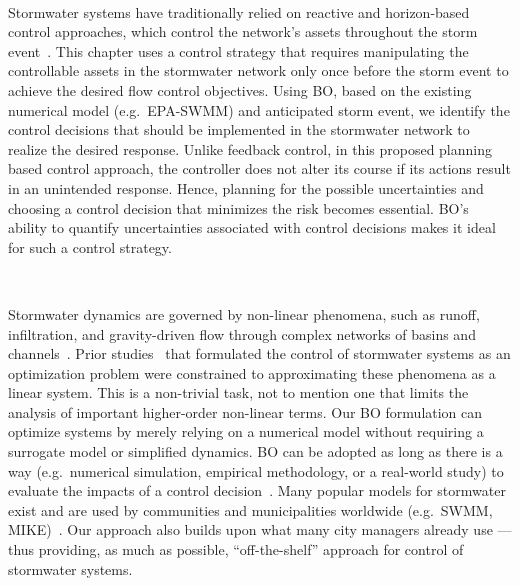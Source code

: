 \

Stormwater systems have traditionally relied on reactive and horizon-based control approaches, which control the network's assets throughout the storm event~\cite{sadler2019, vezzaro2014, Troutman_2020}.
This chapter uses a control strategy that requires manipulating the controllable assets in the stormwater network only once before the storm event to achieve the desired flow control objectives.
Using BO, based on the existing numerical model (e.g.\ EPA-SWMM) and anticipated storm event, we identify the control decisions that should be implemented in the stormwater network to realize the desired response.
Unlike feedback control, in this proposed planning based control approach, the controller does not alter its course if its actions result in an unintended response. 
Hence, planning for the possible uncertainties and choosing a control decision that minimizes the risk becomes essential.
BO's ability to quantify uncertainties associated with control decisions makes it ideal for such a control strategy.


\

Stormwater dynamics are governed by non-linear phenomena, such as runoff, infiltration, and gravity-driven flow through complex networks of basins and channels~\cite{rossman2010storm, Mullapudi_Wong_Kerkez_2017, Rimer2019}.
Prior studies~\cite{lund2020cso} that formulated the control of stormwater systems as an optimization problem were constrained to approximating these phenomena as a linear system.
This is a non-trivial task, not to mention one that limits the analysis of important higher-order non-linear terms. 
Our BO formulation can optimize systems by merely relying on a numerical model without requiring a surrogate model or simplified dynamics.
BO can be adopted as long as there is a way (e.g.\ numerical simulation, empirical methodology, or a real-world study) to evaluate the impacts of a control decision~\cite{frazier2018tutorial}.
Many popular models for stormwater exist and are used by communities and municipalities worldwide (e.g.\ SWMM, MIKE)~\cite{rossman2010storm}.
Our approach also builds upon what many city managers already use --- thus providing, as much as possible, ``off-the-shelf'' approach for control of stormwater systems.


\

